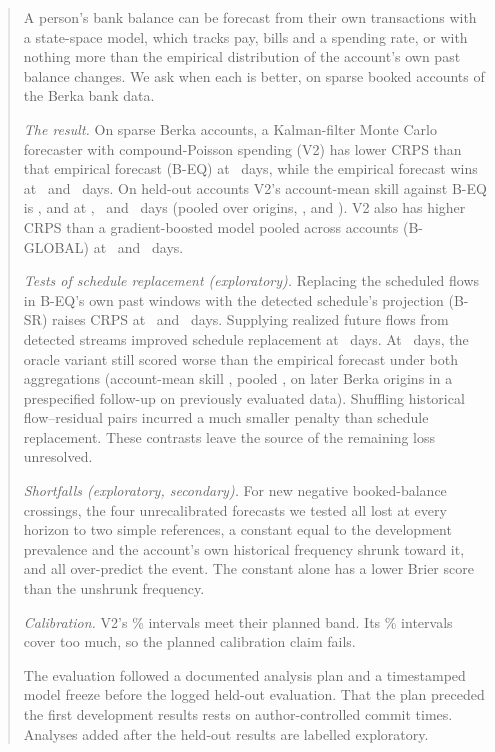 \begin{abstract}
A person's bank balance can be forecast from their own transactions with a
state-space model, which tracks pay, bills and a spending rate, or with
nothing more than the empirical distribution of the account's own past
balance changes. We ask when each is better, on sparse booked accounts of
the Berka bank data.

\emph{The result.} On sparse Berka accounts, a Kalman-filter Monte Carlo
forecaster with compound-Poisson spending (V2) has lower CRPS than that
empirical forecast (B-EQ) at \hA\ days, while the empirical forecast wins
at \hB\ and \hC\ days. On held-out accounts V2's account-mean skill against
B-EQ is ,  and
 at \hA, \hB\ and \hC\ days (pooled over origins,
,  and
). V2 also has higher CRPS than a
gradient-boosted model pooled across accounts (B-GLOBAL) at \hB\ and \hC\
days.

\emph{Tests of schedule replacement (exploratory).} Replacing the scheduled
flows in B-EQ's own past windows with the detected schedule's projection
(B-SR) raises CRPS at \hB\ and \hC\ days. Supplying realized future flows
from detected streams improved schedule replacement at \hB\ days. At \hC\
days, the oracle variant still scored worse than the empirical forecast
under both aggregations (account-mean skill
\R{cf/pred/p2/90/skill_mean@3}, pooled \R{cf/pred/p2/90/skill_pooled@3}, on
later Berka origins in a prespecified follow-up on previously evaluated
data). Shuffling historical flow--residual pairs incurred a much smaller
penalty than schedule replacement. These contrasts leave the source of the
remaining loss unresolved.

\emph{Shortfalls (exploratory, secondary).} For new negative
booked-balance crossings, the four unrecalibrated forecasts we tested all
lost at every horizon to two simple references, a constant equal to
the development prevalence and the account's own historical frequency
shrunk toward it, and all over-predict the event. The constant alone has
a lower Brier score than the unshrunk frequency.

\emph{Calibration.} V2's \lC\% intervals meet their planned band. Its \lA\%
intervals cover too much, so the planned calibration claim fails.

The evaluation followed a documented analysis plan and a timestamped model
freeze before the logged held-out evaluation. That the plan preceded the
first development results rests on author-controlled commit times.
Analyses added after the held-out results are labelled exploratory.
\end{abstract}
